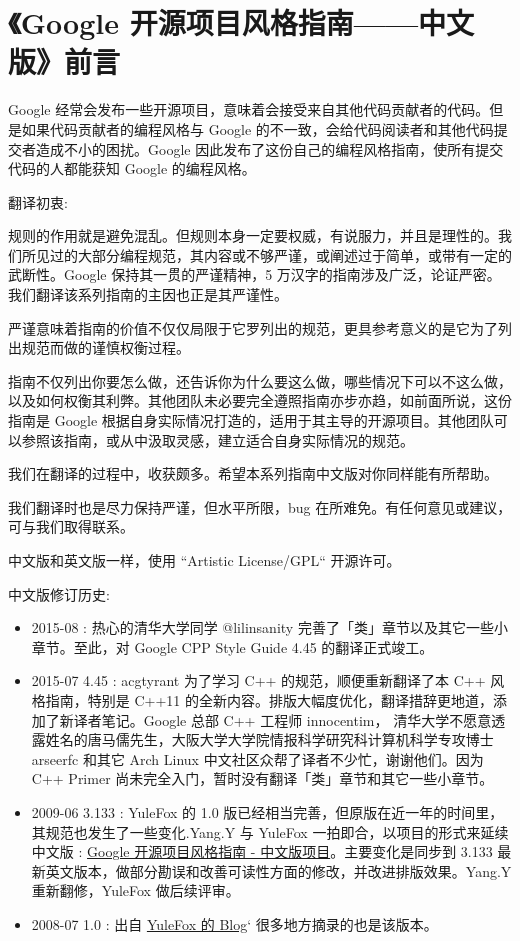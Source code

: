 \section{《Google 开源项目风格指南——中文版》前言}

Google 经常会发布一些开源项目，意味着会接受来自其他代码贡献者的代码。但是如果代码贡献者的编程风格与 Google 的不一致，会给代码阅读者和其他代码提交者造成不小的困扰。Google 因此发布了这份自己的编程风格指南，使所有提交代码的人都能获知 Google 的编程风格。

翻译初衷:

规则的作用就是避免混乱。但规则本身一定要权威，有说服力，并且是理性的。我们所见过的大部分编程规范，其内容或不够严谨，或阐述过于简单，或带有一定的武断性。Google 保持其一贯的严谨精神，5 万汉字的指南涉及广泛，论证严密。我们翻译该系列指南的主因也正是其严谨性。

严谨意味着指南的价值不仅仅局限于它罗列出的规范，更具参考意义的是它为了列出规范而做的谨慎权衡过程。

指南不仅列出你要怎么做，还告诉你为什么要这么做，哪些情况下可以不这么做，以及如何权衡其利弊。其他团队未必要完全遵照指南亦步亦趋，如前面所说，这份指南是 Google 根据自身实际情况打造的，适用于其主导的开源项目。其他团队可以参照该指南，或从中汲取灵感，建立适合自身实际情况的规范。

我们在翻译的过程中，收获颇多。希望本系列指南中文版对你同样能有所帮助。

我们翻译时也是尽力保持严谨，但水平所限，bug 在所难免。有任何意见或建议，可与我们取得联系。

中文版和英文版一样，使用 ``Artistic License/GPL`` 开源许可。

中文版修订历史:

\begin{itemize}
  \item 2015-08 : 热心的清华大学同学 @lilinsanity 完善了「类」章节以及其它一些小章节。至此，对 Google CPP Style Guide 4.45 的翻译正式竣工。
  \item 2015-07 4.45 : acgtyrant 为了学习 C++ 的规范，顺便重新翻译了本 C++ 风格指南，特别是 C++11 的全新内容。排版大幅度优化，翻译措辞更地道，添加了新译者笔记。Google 总部 C++ 工程师 innocentim，	清华大学不愿意透露姓名的唐马儒先生，大阪大学大学院情报科学研究科计算机科学专攻博士 arseerfc 和其它 Arch Linux 	中文社区众帮了译者不少忙，谢谢他们。因为 C++ Primer 尚未完全入门，暂时没有翻译「类」章节和其它一些小章节。
  \item  2009-06 3.133 : YuleFox 的 1.0 版已经相当完善，但原版在近一年的时间里，其规范也发生了一些变化.Yang.Y 与 YuleFox 一拍即合，以项目的形式来延续中文版 : \href{http://github.com/yangyubo/zh-google-styleguide}{Google 开源项目风格指南 - 中文版项目}。主要变化是同步到 3.133 最新英文版本，做部分勘误和改善可读性方面的修改，并改进排版效果。Yang.Y 重新翻修，YuleFox 做后续评审。
  \item  2008-07 1.0 : 出自 \href{http://www.yulefox.com/?p=207}{YuleFox 的 Blog}` 很多地方摘录的也是该版本。
\end{itemize}

